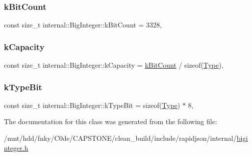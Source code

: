 \mbox{\label{classinternal_1_1BigInteger_a89d6a00e78a914d0b873784539416dc5}} 
\subsubsection{\texorpdfstring{k\+Bit\+Count}{kBitCount}}
{\footnotesize\ttfamily const size\+\_\+t internal\+::\+Big\+Integer\+::k\+Bit\+Count = 3328\hspace{0.3cm}{\ttfamily [static]}, {\ttfamily [private]}}

\mbox{\label{classinternal_1_1BigInteger_a8a908718d685b9bd39fb52f2e511b0c6}} 
\subsubsection{\texorpdfstring{k\+Capacity}{kCapacity}}
{\footnotesize\ttfamily const size\+\_\+t internal\+::\+Big\+Integer\+::k\+Capacity = \hyperlink{classinternal_1_1BigInteger_a89d6a00e78a914d0b873784539416dc5}{k\+Bit\+Count} / sizeof(\hyperlink{classinternal_1_1BigInteger_a1310812fca26ebae77594ba08678fc4c}{Type})\hspace{0.3cm}{\ttfamily [static]}, {\ttfamily [private]}}

\mbox{\label{classinternal_1_1BigInteger_a662666ad4bc9122cb80ba2ac6e88a745}} 
\subsubsection{\texorpdfstring{k\+Type\+Bit}{kTypeBit}}
{\footnotesize\ttfamily const size\+\_\+t internal\+::\+Big\+Integer\+::k\+Type\+Bit = sizeof(\hyperlink{classinternal_1_1BigInteger_a1310812fca26ebae77594ba08678fc4c}{Type}) $\ast$ 8\hspace{0.3cm}{\ttfamily [static]}, {\ttfamily [private]}}



The documentation for this class was generated from the following file\+:\begin{DoxyCompactItemize}
\item 
/mnt/hdd/fnky/\+C0de/\+C\+A\+P\+S\+T\+O\+N\+E/clean\+\_\+build/include/rapidjson/internal/\hyperlink{biginteger_8h}{biginteger.\+h}\end{DoxyCompactItemize}
